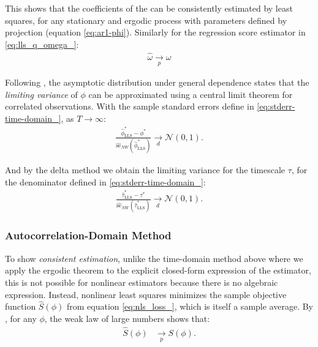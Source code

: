 \documentclass[main.tex]{subfiles}
\begin{document}
\noindent This shows that the coefficients of the  can be consistently estimated by least squares, for any stationary and ergodic process with parameters defined by projection (equation \eqref{eq:ar1-phi}). Similarly for the regression score estimator in \eqref{eq:lls_q_omega_}:
\begin{align}
    \hat \omega \underset{p}{\to} \omega
\end{align}

Following \citet[Theorem~14.33]{hansen_econometrics_2022}, the asymptotic distribution under general dependence states that the \textit{limiting variance} of $\phi$ can be approximated using a central limit theorem for correlated observations. With the sample standard errors define in \eqref{eq:stderr-time-domain_}, as $T\to\infty$:
\begin{align} \label{eq:ar1-phi-clt}
\frac{\hat\phi^*_{\scriptscriptstyle\text{LLS}} - \phi^*}{\widehat{\text{se}}_{NW}(\hat\phi^*_{\scriptscriptstyle\text{LLS}})} \underset{d}{\to} \mathcal{N}(0, 1).
\end{align}

\noindent And by the delta method we obtain the limiting variance for the timescale $\tau$, for the denominator defined in \eqref{eq:stderr-time-domain_}:
\begin{align}
    \frac{\hat{\tau}^*_{\scriptscriptstyle\text{LLS}} - \tau^*}{\widehat{\text{se}}_{NW}(\hat{\tau}^*_{\scriptscriptstyle\text{LLS}}) } \underset{d}{\to} \mathcal{N}(0,1).
\end{align}



\subsubsection{Autocorrelation-Domain Method}

To show \textit{consistent estimation}, unlike the time-domain method above where we apply the ergodic theorem to the explicit closed-form expression of the estimator, this is not possible for nonlinear estimators because there is no algebraic expression. Instead, nonlinear least squares minimizes the sample objective function $\widehat{S}(\phi)$ from equation \eqref{eq:nls_loss_}, which is itself a sample average. By \citet[Theorem~22.1]{hansen_econometrics_2022}, for any $\phi$, the weak law of large numbers shows that:
\begin{align}
\widehat{S}(\phi) &\underset{p}{\to} S(\phi).
\end{align}
\end{document}
